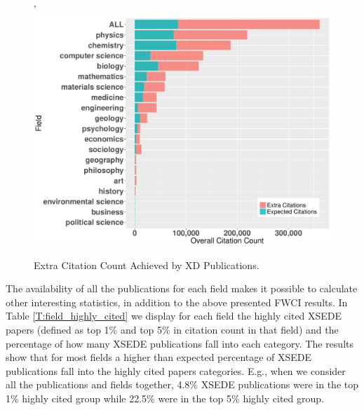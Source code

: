 \documentclass{sig-alternate}
\begin{document}
\begin{figure}[htb!]'
  \centering
    \includegraphics[width=0.95\columnwidth]{images/FWCI_CC.pdf}
    \caption{Extra Citation Count Achieved by XD Publications.}
    \label{F:FWCI_CC}
\end{figure}

The availability of all the publications for each field makes it
possible to calculate other interesting statistics, in addition to the
above presented FWCI results. In Table \ref{T:field_highly_cited} we
display for each field the highly cited XSEDE papers (defined as top
1\% and top 5\% in citation count in that field) and the percentage of
how many XSEDE publications fall into each category. The results show
that for most fields a higher than expected percentage of XSEDE
publications fall into the highly cited papers categories. E.g., when
we consider all the publications and fields together, 4.8\% XSEDE
publications were in the top 1\% highly cited group while 22.5\% were
in the top 5\% highly cited group.
\end{document}
